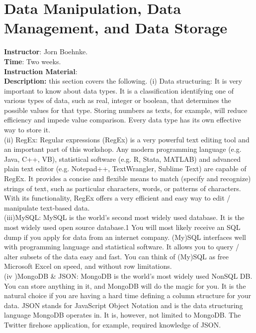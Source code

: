 \section{Data Manipulation, Data Management, and Data Storage}
\noindent \textbf{Instructor}: Jorn Boehnke.\\
\noindent \textbf{Time}: Two weeks.\\
\noindent \textbf{Instruction Material}: \\
\noindent \textbf{Description:} this section covers the following. (i) Data structuring: It is very important to know about data types. It is a classification identifying one of various types of data, such as real, integer or boolean, that determines the possible values for that type. Storing numbers as texts, for example, will reduce efficiency and impede value comparison. Every data type has its own effective way to store it.\\
\indent (ii) RegEx: Regular expressions (RegEx) is a very powerful text editing tool and an important part of this workshop. Any modern programming language (e.g. Java, C++, VB), statistical software (e.g. R, Stata, MATLAB) and advanced plain text editor (e.g. Notepad++, TextWrangler, Sublime Text) are capable of RegEx. It provides a concise and flexible means to match (specify and recognize) strings of text, such as particular characters, words, or patterns of characters. With its functionality, RegEx offers a very efficient and easy way to edit / manipulate text‐based data.\\
\indent (iii)MySQL: MySQL is the world’s second most widely used database. It is the most widely used open source database.1 You will most likely receive an SQL dump if you apply for data from an internet company. (My)SQL interfaces well with programming language and statistical software. It allows you to query / alter subsets of the data easy and fast. You can think of (My)SQL as free Microsoft Excel on speed, and without row limitations.\\
\indent (iv )MongoDB \& JSON: MongoDB is the world’s most widely used NonSQL DB. You can store anything in it, and MongoDB will do the magic for you. It is the natural choice if you are having a hard time defining a column structure for your data. JSON stands for JavaScript Object Notation and is the data structuring language MongoDB operates in. It is, however, not limited to MongoDB. The Twitter firehose application, for example, required knowledge of JSON.
